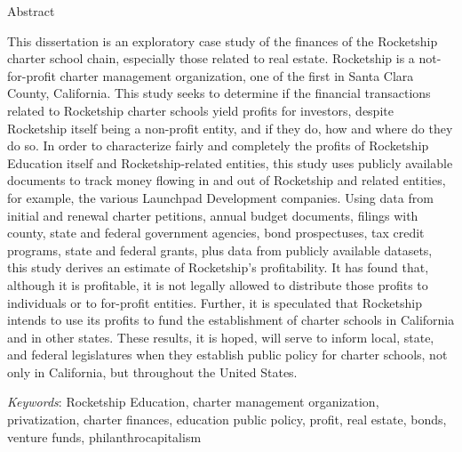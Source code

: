 

\thispagestyle{empty}

\begin{center}
  Abstract\\
\end{center}

This dissertation is an exploratory case study of the finances of the Rocketship charter school chain, especially those related to real estate. Rocketship is a  not-for-profit charter management organization, one of the first in Santa Clara County, California. This study seeks to determine if the financial transactions related to Rocketship charter schools yield profits for investors, despite Rocketship itself being a non-profit entity, and if they do, how and where do they do so. In order to characterize fairly and completely the profits of Rocketship Education itself and Rocketship-related entities, this study uses publicly available documents to track money flowing in and out of Rocketship and related entities, for example, the various Launchpad Development companies. Using data from initial and renewal charter petitions, annual budget documents, filings with county, state and federal government agencies, bond prospectuses, tax credit programs, state and federal grants, plus data from publicly available datasets, this study derives an estimate of Rocketship's profitability. It has found that, although it is profitable, it is not legally allowed to distribute those profits to individuals or to for-profit entities.  Further, it is speculated that Rocketship intends to use its profits to fund the establishment of charter schools in California and in other states. These results, it is hoped, will serve to inform local, state, and federal legislatures when they establish public policy for charter schools, not only in California, but throughout the United States.\bigskip

\noindent\textit{Keywords}: Rocketship Education, charter management organization, privatization, charter finances, education public policy, profit, real estate, bonds, venture funds, philanthrocapitalism

